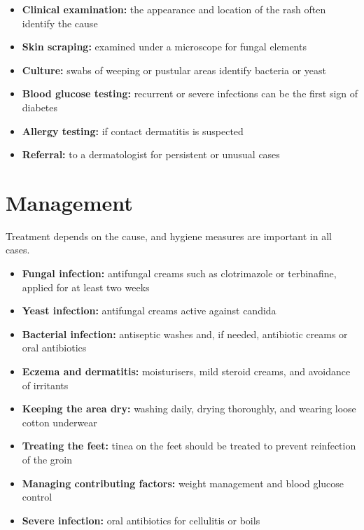 \begin{itemize}
    \item \textbf{Clinical examination:} the appearance and location of the rash often identify the cause
    \item \textbf{Skin scraping:} examined under a microscope for fungal elements
    \item \textbf{Culture:} swabs of weeping or pustular areas identify bacteria or yeast
    \item \textbf{Blood glucose testing:} recurrent or severe infections can be the first sign of diabetes
    \item \textbf{Allergy testing:} if contact dermatitis is suspected
    \item \textbf{Referral:} to a dermatologist for persistent or unusual cases
\end{itemize}

\section*{Management}
Treatment depends on the cause, and hygiene measures are important in all cases.

\begin{itemize}
    \item \textbf{Fungal infection:} antifungal creams such as clotrimazole or terbinafine, applied for at least two weeks
    \item \textbf{Yeast infection:} antifungal creams active against candida
    \item \textbf{Bacterial infection:} antiseptic washes and, if needed, antibiotic creams or oral antibiotics
    \item \textbf{Eczema and dermatitis:} moisturisers, mild steroid creams, and avoidance of irritants
    \item \textbf{Keeping the area dry:} washing daily, drying thoroughly, and wearing loose cotton underwear
    \item \textbf{Treating the feet:} tinea on the feet should be treated to prevent reinfection of the groin
    \item \textbf{Managing contributing factors:} weight management and blood glucose control
    \item \textbf{Severe infection:} oral antibiotics for cellulitis or boils
\end{itemize}

